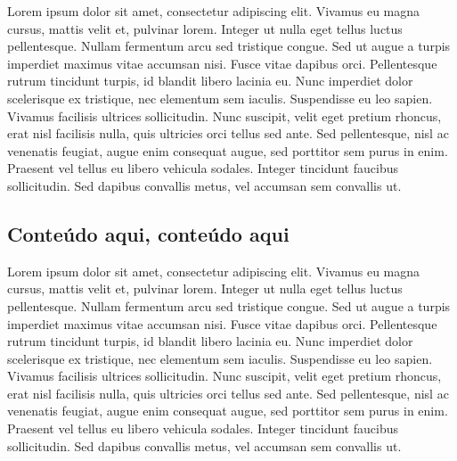 Lorem ipsum dolor sit amet, consectetur adipiscing elit. Vivamus eu magna cursus, mattis velit et, pulvinar lorem. Integer ut nulla eget tellus luctus pellentesque. Nullam fermentum arcu sed tristique congue. Sed ut augue a turpis imperdiet maximus vitae accumsan nisi. Fusce vitae dapibus orci. Pellentesque rutrum tincidunt turpis, id blandit libero lacinia eu. Nunc imperdiet dolor scelerisque ex tristique, nec elementum sem iaculis. Suspendisse eu leo sapien. Vivamus facilisis ultrices sollicitudin. Nunc suscipit, velit eget pretium rhoncus, erat nisl facilisis nulla, quis ultricies orci tellus sed ante. Sed pellentesque, nisl ac venenatis feugiat, augue enim consequat augue, sed porttitor sem purus in enim. Praesent vel tellus eu libero vehicula sodales. Integer tincidunt faucibus sollicitudin. Sed dapibus convallis metus, vel accumsan sem convallis ut.

\subsection{Conteúdo aqui, conteúdo aqui}
\label{subsec:thresholding}

Lorem ipsum dolor sit amet, consectetur adipiscing elit. Vivamus eu magna cursus, mattis velit et, pulvinar lorem. Integer ut nulla eget tellus luctus pellentesque. Nullam fermentum arcu sed tristique congue. Sed ut augue a turpis imperdiet maximus vitae accumsan nisi. Fusce vitae dapibus orci. Pellentesque rutrum tincidunt turpis, id blandit libero lacinia eu. Nunc imperdiet dolor scelerisque ex tristique, nec elementum sem iaculis. Suspendisse eu leo sapien. Vivamus facilisis ultrices sollicitudin. Nunc suscipit, velit eget pretium rhoncus, erat nisl facilisis nulla, quis ultricies orci tellus sed ante. Sed pellentesque, nisl ac venenatis feugiat, augue enim consequat augue, sed porttitor sem purus in enim. Praesent vel tellus eu libero vehicula sodales. Integer tincidunt faucibus sollicitudin. Sed dapibus convallis metus, vel accumsan sem convallis ut.



